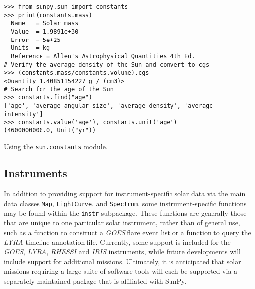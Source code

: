 \begin{listing}[H]
\begin{verbatim}
>>> from sunpy.sun import constants
>>> print(constants.mass)
  Name   = Solar mass
  Value  = 1.9891e+30
  Error  = 5e+25
  Units  = kg
  Reference = Allen's Astrophysical Quantities 4th Ed.
# Verify the average density of the Sun and convert to cgs
>>> (constants.mass/constants.volume).cgs
<Quantity 1.40851154227 g / (cm3)>
# Search for the age of the Sun
>>> constants.find("age")
['age', 'average angular size', 'average density', 'average intensity']
>>> constants.value('age'), constants.unit('age')
(4600000000.0, Unit("yr"))
\end{verbatim}
\caption{Using the \texttt{sun.constants} module.}
\label{code:constants_code}
\end{listing}
	
\subsection{Instruments}\label{ssec:util:inst}
In addition to providing support for instrument-specific solar data via the main data 
classes \texttt{Map}, \texttt{LightCurve}, and \texttt{Spectrum}, 
some instrument-specific functions may be found within the \texttt{instr} subpackage. 
These functions are generally those that are unique to one particular solar instrument, 
rather than of general use, such as a function to construct a \textit{GOES} flare event list 
or a function to query the \textit{LYRA} timeline annotation file. Currently, some support is included
 for the \textit{GOES}, \textit{LYRA}, \textit{RHESSI} and \textit{IRIS} instruments, while future developments 
 will include support for additional missions. Ultimately, it is anticipated that solar
  missions requiring a large suite of software tools will each be supported via a separately 
  maintained package that is affiliated with SunPy.

